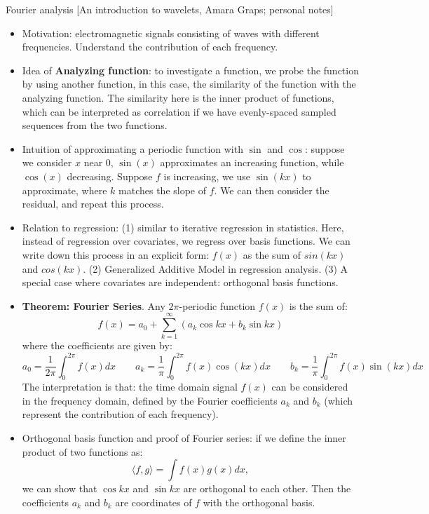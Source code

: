 \documentclass{report}
\begin{document}
Fourier analysis [An introduction to wavelets, Amara Graps; personal notes]
\begin{itemize}
	\item Motivation: electromagnetic signals consisting of waves with different frequencies. Understand the contribution of each frequency. 
	
	\item Idea of \textbf{Analyzing function}: to investigate a function, we probe the function by using another function, in this case, the similarity of the function with the analyzing function. The similarity here is the inner product of functions, which can be interpreted as correlation if we have evenly-spaced sampled sequences from the two functions. 
	
	\item Intuition of approximating a periodic function with $\sin$ and $\cos$: suppose we consider $x$ near 0, $\sin(x)$ approximates an increasing function, while $\cos(x)$ decreasing. Suppose $f$ is increasing, we use $\sin(kx)$ to approximate, where $k$ matches the slope of $f$. We can then consider the residual, and repeat this process. 
	
	\item Relation to regression: (1) similar to iterative regression in statistics. Here, instead of regression over covariates, we regress over basis functions. We can write down this process in an explicit form: $f(x)$ as the sum of $sin(kx)$ and $cos(kx)$. (2) Generalized Additive Model in regression analysis. (3) A special case where covariates are independent: orthogonal basis functions. 
	
	\item \textbf{Theorem: Fourier Series}. Any $2\pi$-periodic function $f(x)$ is the sum of: 
	\begin{equation}
	f(x) = a_0 + \sum_{k=1}^{\infty} (a_k \cos kx + b_k \sin kx)
	\end{equation}
	where the coefficients are given by: 
	\begin{equation}
	a_0 = \frac{1}{2\pi} \int_0^{2\pi} f(x) dx \qquad a_k = \frac{1}{\pi} \int_0^{2\pi} f(x) \cos(kx)dx \qquad b_k = \frac{1}{\pi} \int_0^{2\pi} f(x) \sin(kx)dx
	\end{equation}
	The interpretation is that: the time domain signal $f(x)$ can be considered in the frequency domain, defined by the Fourier coefficients $a_k$ and $b_k$ (which represent the contribution of each frequency). 
	
	\item Orthogonal basis function and proof of Fourier series: if we define the inner product of two functions as: 
	\begin{equation}
	\langle f, g \rangle = \int f(x) g(x) dx,
	\end{equation}
	we can show that $\cos kx$ and $\sin kx$ are orthogonal to each other. Then the coefficients $a_k$ and $b_k$ are coordinates of $f$ with the orthogonal basis. 
	

\end{itemize}
\end{document}
